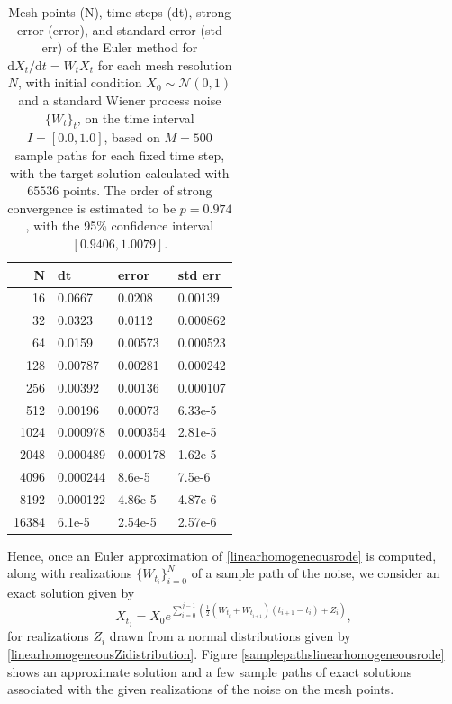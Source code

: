 \documentclass[reqno,12pt]{amsart}
\theoremstyle{plain} %
\theoremstyle{definition} %
\begin{document}
\begin{table}
        \begin{tabular}[htb]{|r|l|l|l|}
        \hline N & dt & error & std err \\
        \hline \hline
        16 & 0.0667 & 0.0208 & 0.00139 \\
        32 & 0.0323 & 0.0112 & 0.000862 \\
        64 & 0.0159 & 0.00573 & 0.000523 \\
        128 & 0.00787 & 0.00281 & 0.000242 \\
        256 & 0.00392 & 0.00136 & 0.000107 \\
        512 & 0.00196 & 0.00073 & 6.33e-5 \\
        1024 & 0.000978 & 0.000354 & 2.81e-5 \\
        2048 & 0.000489 & 0.000178 & 1.62e-5 \\
        4096 & 0.000244 & 8.6e-5 & 7.5e-6 \\
        8192 & 0.000122 & 4.86e-5 & 4.87e-6 \\
        16384 & 6.1e-5 & 2.54e-5 & 2.57e-6 \\
        \hline
    \end{tabular}
    \bigskip

    \caption{Mesh points (N), time steps (dt), strong error (error), and standard error (std err) of the Euler method for $\mathrm{d}X_t/\mathrm{d}t = W_t X_t$ for each mesh resolution $N$, with initial condition $X_0 \sim \mathcal{N}(0, 1)$ and a standard Wiener process noise $\{W_t\}_t$, on the time interval $I = [0.0, 1.0]$, based on $M = 500$ sample paths for each fixed time step, with the target solution calculated with $65536$ points. The order of strong convergence is estimated to be $p = 0.974$, with the 95\% confidence interval $[0.9406, 1.0079]$.}
    \label{tablinearhomogeneousrode}
\end{table}

Hence, once an Euler approximation of \eqref{linearhomogeneousrode} is computed, along with realizations $\{W_{t_i}\}_{i=0}^N$ of a sample path of the noise, we consider an exact solution given by
\begin{equation}
    \label{Xtlinearhomogeneousrode}
    X_{t_j} = X_0 e^{\sum_{i = 0}^{j-1}\left(\frac{1}{2}\left(W_{t_i} + W_{t_{i+1}}\right)(t_{i+1} - t_i) + Z_i\right)},
\end{equation}
for realizations $Z_i$ drawn from a normal distributions given by \eqref{linearhomogeneousZidistribution}. Figure \ref{samplepathslinearhomogeneousrode} shows an approximate solution and a few sample paths of exact solutions associated with the given realizations of the noise on the mesh points.
\end{document}
